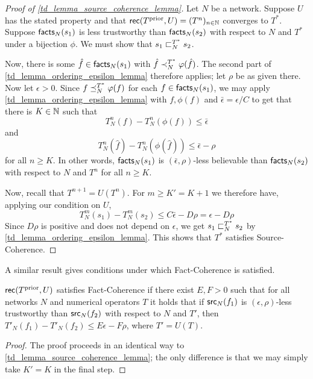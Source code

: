 \begin{proof}[Proof of \cref{td_lemma_source_coherence_lemma}]

Let $N$ be a network. Suppose $U$ has the stated property and that
$\mathsf{rec}(T^{\text{prior}}, U) = (T^n)_{n \in \mathbb{N}}$ converges to $T^*$. Suppose
$\mathsf{facts}_N(s_1)$ is less trustworthy than $\mathsf{facts}_N(s_2)$ with respect to $N$
and $T^*$ under a bijection $\phi$. We must show that $s_1 \sqsubset_N^{T^*} s_2$.

Now, there is some $\hat{f} \in \mathsf{facts}_N(s_1)$ with $\hat{f} \prec_N^{T^*}
\varphi(\hat{f})$. The second part of \cref{td_lemma_ordering_epsilon_lemma}
therefore applies; let $\rho$ be as given there. Now let $\epsilon > 0$.
Since $f \preceq_N^{T^*} \varphi(f)$ for each $f \in \mathsf{facts}_N(s_1)$, we may apply
\cref{td_lemma_ordering_epsilon_lemma} with $f, \phi(f)$ and
$\bar{\epsilon} = \epsilon / C$ to get that there is $K \in \mathbb{N}$ such that
\[
    T_N^n(f) - T_N^n(\phi(f)) \le \bar{\epsilon}
\]
and
\[
    T_N^n(\hat{f}) - T_N^n(\phi(\hat{f})) \le \bar{\epsilon} - \rho
\]
for all $n \ge K$. In other words, $\mathsf{facts}_N(s_1)$ is $(\bar{\epsilon},
\rho)$-less believable than $\mathsf{facts}_N(s_2)$ with respect to $N$ and $T^n$ for
all $n \ge K$.

Now, recall that $T^{n+1}=U(T^n)$. For $m \ge K' = K + 1$ we therefore have,
applying our condition on $U$,
\[
    T_N^m(s_1) - T_N^m(s_2) \le C\bar{\epsilon} - D\rho
    = \epsilon - D\rho
\]
Since $D\rho$ is positive and does not depend on $\epsilon$, we get $s_1
\sqsubset_N^{T^*} s_2$ by \cref{td_lemma_ordering_epsilon_lemma}. This shows that
$T^*$ satisfies Source-Coherence.
\end{proof}

A similar result gives conditions under which Fact-Coherence is satisfied.

\begin{lemma}
\label{td_lemma_fact_coherence_lemma}

$\mathsf{rec}(T^{\text{prior}}, U)$ satisfies Fact-Coherence if there exist $E, F > 0$
such that for all networks $N$ and numerical operators $T$ it holds that if
$\mathsf{src}_N(f_1)$ is $(\epsilon, \rho)$-less trustworthy than $\mathsf{src}_N(f_2)$ with
respect to $N$ and $T'$, then
    $T'_N(f_1) - T'_N(f_2) \le E\epsilon - F\rho$,
where $T' = U(T)$.

\end{lemma}

\begin{proof}
The proof proceeds in an identical way to \cref{td_lemma_source_coherence_lemma};
the only difference is that we may simply
take $K' = K$ in the final step.
\end{proof}

